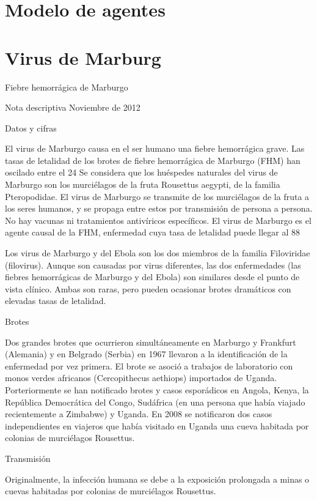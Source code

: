 \section{Modelo de agentes}


\section{Virus de Marburg}
Fiebre hemorrágica de Marburgo

Nota descriptiva 
Noviembre de 2012

Datos y cifras

El virus de Marburgo causa en el ser humano una fiebre hemorrágica grave.
Las tasas de letalidad de los brotes de fiebre hemorrágica de Marburgo (FHM) han oscilado entre el 24%
Se considera que los huéspedes naturales del virus de Marburgo son los murciélagos de la fruta Rousettus aegypti, de la familia Pteropodidae. El virus de Marburgo se transmite de los murciélagos de la fruta a los seres humanos, y se propaga entre estos por transmisión de persona a persona.
No hay vacunas ni tratamientos antivíricos específicos.
El virus de Marburgo es el agente causal de la FHM, enfermedad cuya tasa de letalidad puede llegar al 88%

Los virus de Marburgo y del Ebola son los dos miembros de la familia Filoviridae (filovirus). Aunque son causadas por virus diferentes, las dos enfermedades (las fiebres hemorrágicas de Marburgo y del Ebola) son similares desde el punto de vista clínico. Ambas son raras, pero pueden ocasionar brotes dramáticos con elevadas tasas de letalidad.

Brotes

Dos grandes brotes que ocurrieron simultáneamente en Marburgo y Frankfurt (Alemania) y en Belgrado (Serbia) en 1967 llevaron a la identificación de la enfermedad por vez primera. El brote se asoció a trabajos de laboratorio con monos verdes africanos (Cercopithecus aethiops) importados de Uganda. Porteriormente se han notificado brotes y casos esporádicos en Angola, Kenya, la República Democrática del Congo, Sudáfrica (en una persona que había viajado recientemente a Zimbabwe) y Uganda. En 2008 se notificaron dos casos independientes en viajeros que había visitado en Uganda una cueva habitada por colonias de murciélagos Rousettus.

Transmisión

Originalmente, la infección humana se debe a la exposición prolongada a minas o cuevas habitadas por colonias de murciélagos Rousettus.

